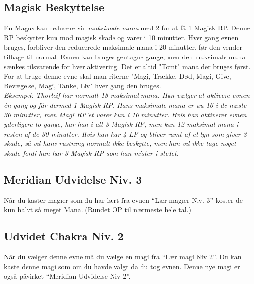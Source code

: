 \subsection{Magisk Beskyttelse}
En Magus kan reducere sin \textit{maksimale mana} med 2 for at få 1 Magisk RP. Denne RP beskytter kun mod magisk skade og varer i 10 minutter. Hver gang evnen bruges, forbliver den reducerede maksimale mana i 20 minutter, før den vender tilbage til normal. Evnen kan bruges gentagne gange, men den maksimale mana sænkes tilsvarende for hver aktivering. Det er altid "Tomt" mana der bruges først. For at bruge denne evne skal man riterne "Magi, Trække, Død, Magi, Give, Bevægelse, Magi, Tanke, Liv" hver gang den bruges.\\
\textit{Eksempel: Thorleif har normalt 18 maksimal mana. Han vælger at aktivere evnen én gang og får dermed 1 Magisk RP. Hans maksimale mana er nu 16 i de næste 30 minutter, men Magi RP’et varer kun i 10 minutter. Hvis han aktiverer evnen yderligere to gange, har han i alt 3 Magisk RP, men kun 12 maksimal mana i resten af de 30 minutter. Hvis han har 4 LP og bliver ramt af et lyn som giver 3 skade, så vil hans rustning normalt ikke beskytte, men han vil ikke tage noget skade fordi han har 3 Magisk RP som han mister i stedet.}


\subsection{Meridian Udvidelse Niv. 3}
Når du kaster magier som du har lært fra evnen “Lær magier Niv. 3” koster de kun halvt så meget Mana. (Rundet OP til nærmeste hele tal.)

\subsection{Udvidet Chakra Niv. 2}
Når du vælger denne evne må du vælge en magi fra “Lær magi Niv 2”. Du kan kaste denne magi som om du havde valgt da du tog evnen. Denne nye magi er også påvirket “Meridian Udvidelse Niv 2”.
